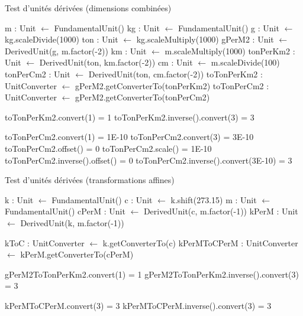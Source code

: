 \documentclass[a4paper,twoside,10pt]{article}
\begin{document}
\begin{algorithm}[!h]
\caption{Test d'unités dérivées (dimensions combinées)}\label{combinedDerivedTest}
\begin{algorithmic}

\State m : Unit $\gets$ FundamentalUnit()
\State kg : Unit $\gets$ FundamentalUnit()
\State g : Unit $\gets$ kg.scaleDivide(1000)
\State ton : Unit $\gets$ kg.scaleMultiply(1000)
\State gPerM2 : Unit $\gets$ DerivedUnit(g, m.factor(-2))
\State km : Unit $\gets$ m.scaleMultiply(1000)
\State tonPerKm2 : Unit $\gets$ DerivedUnit(ton, km.factor(-2))
\State cm : Unit $\gets$ m.scaleDivide(100)
\State tonPerCm2 : Unit $\gets$ DerivedUnit(ton, cm.factor(-2))
\State toTonPerKm2 : UnitConverter $\gets$ gPerM2.getConverterTo(tonPerKm2)
\State toTonPerCm2 : UnitConverter $\gets$ gPerM2.getConverterTo(tonPerCm2)

\Require toTonPerKm2.convert(1) = 1
\Require toTonPerKm2.inverse().convert(3) = 3

\Require toTonPerCm2.convert(1) = 1E-10
\Require toTonPerCm2.convert(3) = 3E-10
\Require toTonPerCm2.offset() = 0
\Require toTonPerCm2.scale() = 1E-10
\Require toTonPerCm2.inverse().offset() = 0
\Require toTonPerCm2.inverse().convert(3E-10) = 3
\EndProcedure
\end{algorithmic}
\end{algorithm}

\begin{algorithm}[!h]
\caption{Test d'unités dérivées (transformations affines)}\label{affineDerivedTest}
\begin{algorithmic}

\State k : Unit $\gets$ FundamentalUnit()
\State c : Unit $\gets$ k.shift(273.15)
\State m : Unit $\gets$ FundamentalUnit()
\State cPerM : Unit $\gets$ DerivedUnit(c, m.factor(-1))
\State kPerM : Unit $\gets$ DerivedUnit(k, m.factor(-1))

\State kToC : UnitConverter $\gets$ k.getConverterTo(c)
\State kPerMToCPerM : UnitConverter $\gets$ kPerM.getConverterTo(cPerM)

\Require gPerM2ToTonPerKm2.convert(1) = 1
\Require gPerM2ToTonPerKm2.inverse().convert(3) = 3

\Require kPerMToCPerM.convert(3) = 3
\Require kPerMToCPerM.inverse().convert(3) = 3
\EndProcedure
\end{algorithmic}
\end{algorithm}
\end{document}
